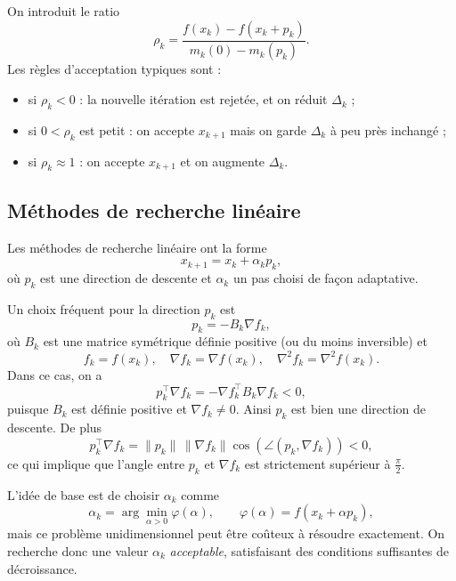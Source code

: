 On introduit le ratio
\begin{equation}
    \rho_k =
    \frac{f(x_k) - f(x_k + p_k)}{m_k(0) - m_k(p_k)}.
\end{equation}
Les règles d’acceptation typiques sont :
\begin{itemize}
    \item si $\rho_k < 0$ : la nouvelle itération est rejetée, et on réduit $\Delta_k$ ;
    \item si $0 < \rho_k$ est petit : on accepte $x_{k+1}$ mais on garde $\Delta_k$
    à peu près inchangé ;
    \item si $\rho_k \approx 1$ : on accepte $x_{k+1}$ et on augmente $\Delta_k$.
\end{itemize}

\subsection{Méthodes de recherche linéaire}
\label{subsec:2.3.2}

Les méthodes de recherche linéaire ont la forme
\[
    x_{k+1} = x_k + \alpha_k p_k,
\]
où $p_k$ est une direction de descente et $\alpha_k$ un pas choisi de façon adaptative.

Un choix fréquent pour la direction $p_k$ est
\begin{equation}
    p_k = -B_k \nabla f_k,
\end{equation}
où $B_k$ est une matrice symétrique définie positive (ou du moins inversible) et
\[
    f_k = f(x_k),\quad \nabla f_k = \nabla f(x_k),\quad
    \nabla^2 f_k = \nabla^2 f(x_k).
\]
Dans ce cas, on a
\begin{equation}
    p_k^\top \nabla f_k
    = -\nabla f_k^\top B_k \nabla f_k < 0,
\end{equation}
puisque $B_k$ est définie positive et $\nabla f_k \neq 0$. Ainsi $p_k$ est
bien une direction de descente. De plus
\[
    p_k^\top \nabla f_k
    = \|p_k\|\,\|\nabla f_k\|\cos(\angle(p_k,\nabla f_k)) < 0,
\]
ce qui implique que l’angle entre $p_k$ et $\nabla f_k$ est strictement supérieur
à $\frac{\pi}{2}$.

\medskip

L’idée de base est de choisir $\alpha_k$ comme
\[
    \alpha_k = \arg\min_{\alpha>0} \varphi(\alpha),
    \qquad \varphi(\alpha) = f(x_k + \alpha p_k),
\]
mais ce problème unidimensionnel peut être coûteux à résoudre exactement. On
recherche donc une valeur $\alpha_k$ \emph{acceptable}, satisfaisant des conditions
suffisantes de décroissance.

